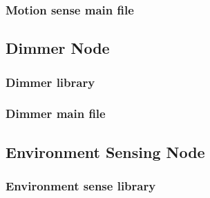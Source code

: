 \subsubsection{Motion sense main file}


\pagebreak

\subsection{Dimmer Node}
\label{an:dimmer-code}

\subsubsection{Dimmer library}



\subsubsection{Dimmer main file}


\pagebreak

\subsection{Environment Sensing Node}
\label{an:environment-code}

\subsubsection{Environment sense library}




